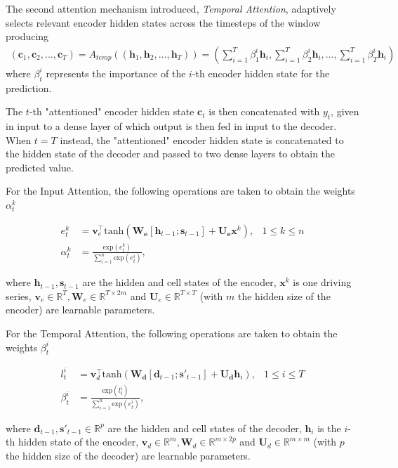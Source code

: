 \documentclass{article}
\begin{document}
The second attention mechanism introduced, \textit{Temporal Attention}, adaptively
selects relevant encoder hidden states across the timesteps of the window
producing
\begin{align*}
(\mathbf{c}_1, \mathbf{c}_2, ..., \mathbf{c}_T) = A_{temp}((\mathbf{h}_1, \mathbf{h}_2, ..., \mathbf{h}_T)) =
\left(\sum_{i=1}^T \beta_1^i \mathbf{h}_i, \sum_{i=1}^T \beta_2^i\mathbf{h}_i, ..., \sum_{i=1}^T \beta_T^i\mathbf{h}_i \right)
\end{align*}
where $\beta^i_t$ represents the importance of the $i$-th encoder
hidden state for the prediction.

The $t$-th "attentioned" encoder hidden state $\mathbf{c}_t$ is then concatenated with
$y_t$, given in input to a dense layer of which output is then fed in input
to the decoder. When $t = T$ instead, the "attentioned" encoder hidden state is 
concatenated to the hidden state of the decoder and passed to two dense layers
to obtain the predicted value.


For the Input Attention, the following operations are taken to
obtain the weights $\alpha_t^k$

\begin{align*}
e_t^k &= \mathbf{v}_e^\top\text{tanh}(
		 \mathbf{W_e}[\mathbf{h}_{t-1};\mathbf{s}_{t-1}] +\mathbf{U_e}\mathbf{x}^k), & 1 \le k \le n \\
\alpha_t^k &= \frac{\text{exp}(e_t^k)}{\sum_{i=1}^n \text{exp}(e_t^i)}, 
\end{align*}

where $\mathbf{h}_{t-1}, \mathbf{s}_{t-1}$ are the hidden and cell states 
of the encoder, $\mathbf{x}^k$ is one driving series, 
$\mathbf{v}_e \in \mathbb{R}^T, \mathbf{W}_e \in \mathbb{R}^{T\times 2m}$ and 
$\mathbf{U}_e \in \mathbb{R}^{T\times T}$ (with $m$ the hidden size of the encoder)
are learnable parameters.

For the Temporal Attention, the following operations are taken to
obtain the weights $\beta_t^i$

\begin{align*}
l_t^i &= \mathbf{v}_d^\top\text{tanh}(
		 \mathbf{W_d}[\mathbf{d}_{t-1};\mathbf{s}'_{t-1}] +\mathbf{U_d}\mathbf{h}_i), & 1 \le i \le T \\
\beta_t^i &= \frac{\text{exp}(l_t^i)}{\sum_{i=1}^n \text{exp}(e_t^i)}, 
\end{align*}

where $\mathbf{d}_{t-1}, \mathbf{s}'_{t-1} \in \mathbb{R}^p$ are the hidden and cell states 
of the decoder, $\mathbf{h}_i$ is the $i$-th hidden state of the encoder, 
$\mathbf{v}_d \in \mathbb{R}^m, \mathbf{W}_d \in \mathbb{R}^{m \times 2p}$ and 
$\mathbf{U}_d \in \mathbb{R}^{m\times m}$ (with $p$ the hidden size of the decoder)
are learnable parameters.
\end{document}
